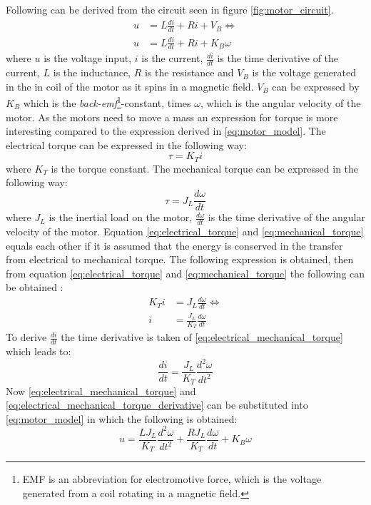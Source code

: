 Following can be derived from the circuit seen in figure \ref{fig:motor_circuit}.
\begin{align}
	u &= L\frac{di}{dt} +  Ri + V_B \Longleftrightarrow\\
	u &= L\frac{di}{dt} +  Ri + K_B\omega\label{eq:motor_model}
\end{align}
where $u$ is the voltage input, $i$ is the current, $\frac{di}{dt}$ is the time derivative of the current, $L$ is the inductance, $R$ is the resistance and $V_B$ is the voltage generated in the in coil of the motor as it spins in a magnetic field. $V_B$ can be expressed by $K_B$ which is the \textit{back-emf}\footnote{EMF is an abbreviation for electromotive force, which is the voltage generated from a coil rotating in a magnetic field.}-constant, times $\omega$, which is the angular velocity of the motor. As the motors need to move a mass an expression for torque is more interesting compared to the expression derived in \ref{eq:motor_model}. The electrical torque can be expressed in the following way:
\begin{equation}
	\tau = K_Ti\label{eq:electrical_torque}
\end{equation}
where $K_T$ is the torque constant.	The mechanical torque can be expressed in the following way:
\begin{equation}
	\tau = J_L\frac{d\omega}{dt}\label{eq:mechanical_torque}
\end{equation}
where $J_L$ is the inertial load on the motor, $\frac{d\omega}{dt}$ is the time derivative of the angular velocity of the motor. Equation \ref{eq:electrical_torque} and \ref{eq:mechanical_torque} equals each other if it is assumed that the energy is conserved in the transfer from electrical to mechanical torque. The following expression is obtained, then from equation \ref{eq:electrical_torque} and \ref{eq:mechanical_torque} the following can be obtained :
\begin{align}
	K_Ti &= J_L\frac{d\omega}{dt} \Leftrightarrow\\
	i &= \frac{J_L}{K_T} \frac{d\omega}{dt}\label{eq:electrical_mechanical_torque}
\end{align}
To derive $\frac{di}{dt}$ the time derivative is taken of \ref{eq:electrical_mechanical_torque} which leads to:
\begin{equation}
	\frac{di}{dt} = \frac{J_L}{K_T} \frac{d^{2}\omega}{dt^{2}}\label{eq:electrical_mechanical_torque_derivative}
\end{equation}
Now \ref{eq:electrical_mechanical_torque} and \ref{eq:electrical_mechanical_torque_derivative} can be substituted into \ref{eq:motor_model} in which the following is obtained:
\begin{equation}
	u = \frac{L J_L}{K_T} \frac{d^{2}\omega}{dt^{2}} + \frac{R J_L}{K_T} \frac{d\omega}{dt} + K_B \omega\label{eq:model_model}
\end{equation}

